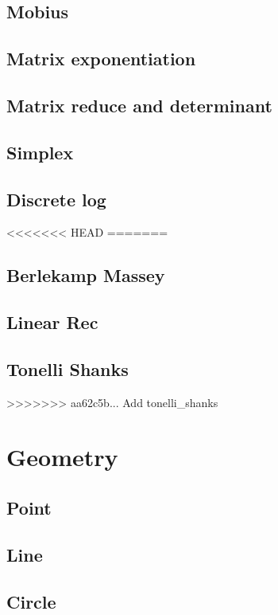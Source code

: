 \subsection{Mobius}
\subsection{Matrix exponentiation}
\subsection{Matrix reduce and determinant}
\subsection{Simplex}
\subsection{Discrete log}
<<<<<<< HEAD
=======
\subsection{Berlekamp Massey}
\subsection{Linear Rec}
\subsection{Tonelli Shanks}
>>>>>>> aa62c5b... Add tonelli_shanks

\section{Geometry}
\subsection{Point}
\subsection{Line}
\subsection{Circle}
